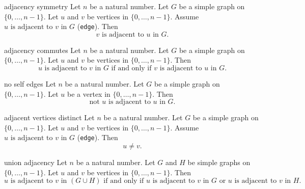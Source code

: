 \begin{cleanresult}{adjacency symmetry}
Let $n$ be a natural number.
Let $G$ be a simple graph on $\{0,\ldots,n-1\}$.
Let $u$ and $v$ be vertices in $\{0,\ldots,n-1\}$.
Assume $u\text{ is adjacent to }v\text{ in }G$ (\texttt{edge}).
Then \[v\text{ is adjacent to }u\text{ in }G.\]
\end{cleanresult}

\begin{cleanresult}{adjacency commutes}
Let $n$ be a natural number.
Let $G$ be a simple graph on $\{0,\ldots,n-1\}$.
Let $u$ and $v$ be vertices in $\{0,\ldots,n-1\}$.
Then \[u\text{ is adjacent to }v\text{ in }G\text{ if and only if }v\text{ is adjacent to }u\text{ in }G.\]
\end{cleanresult}

\begin{cleanresult}{no self edges}
Let $n$ be a natural number.
Let $G$ be a simple graph on $\{0,\ldots,n-1\}$.
Let $u$ be a vertex in $\{0,\ldots,n-1\}$.
Then \[\text{not }u\text{ is adjacent to }u\text{ in }G.\]
\end{cleanresult}

\begin{cleanresult}{adjacent vertices distinct}
Let $n$ be a natural number.
Let $G$ be a simple graph on $\{0,\ldots,n-1\}$.
Let $u$ and $v$ be vertices in $\{0,\ldots,n-1\}$.
Assume $u\text{ is adjacent to }v\text{ in }G$ (\texttt{edge}).
Then \[u\ne v.\]
\end{cleanresult}

\begin{cleanresult}{union adjacency}
Let $n$ be a natural number.
Let $G$ and $H$ be simple graphs on $\{0,\ldots,n-1\}$.
Let $u$ and $v$ be vertices in $\{0,\ldots,n-1\}$.
Then \[u\text{ is adjacent to }v\text{ in }(G \cup H)\text{ if and only if }u\text{ is adjacent to }v\text{ in }G\text{ or }u\text{ is adjacent to }v\text{ in }H.\]
\end{cleanresult}

